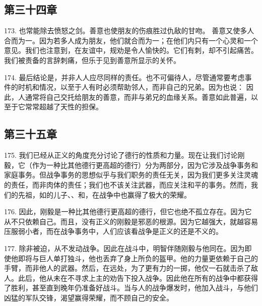\subsection{第三十四章}

\par

173. 也常能除去愤怒之剑。善意也使朋友的伤痕胜过仇敌的甘吻。 善意又使多人合而为一。因为若多人成为朋友，他们就合而为一；在他们内只有一个心灵和一个意见。我们也注意到，在友谊中，规劝是令人愉快的。它们有刺，却不引起痛苦。我们被责备的言辞刺痛，但乐于见到善意所显示的关怀。\par

174. 最后结论是，并非人人应尽同样的责任。也不可偏待人，尽管通常要考虑事件的时机和情况，以至于人有时必须帮助邻人，而非自己的兄弟。因为也说： 因此，人通常将自己交托给朋友的善意，而非与弟兄的血缘关系。善意如此普遍，以至于它常常超越了天性的担保。\par


\subsection{第三十五章}

\par

175. 我们已经从正义的角度充分讨论了德行的性质和力量。现在让我们讨论刚毅，它（作为一种比其他德行更高超的德行）分为两部分，因为它涉及战争事务和家庭事务。但战争事务的思想似乎与我们职务的责任无关，因为我们更多关注灵魂的责任，而非肉体的责任；我们也不该关注武器，而应关注和平的事务。然而，我们的先祖，如的儿子、、和，在战争中也赢得了极大的荣耀。\par

176. 因此，刚毅是一种比其他德行更高超的德行，但它也绝不孤立存在。因为它从不只依赖自己。而且，没有正义的刚毅是邪恶的根源。因为它越强大，就越容易压服弱小者，而在战争事务中，人们应该看战争是正义的还是不义的。\par

177. 除非被迫，从不发动战争。因此在战斗中，明智伴随刚毅与他同在。因为即使他即将与巨人单打独斗，他也丢弃了身上所负的盔甲。他的力量更依赖于自己的手臂，而非他人的武器。然后，在远处，为了更有力的一掷，他仅一石就击杀了敌人。此后，他从未在不寻求上主的劝告下投入战争。因此他在所有的战争中都获得了胜利，甚至直到晚年仍准备好战斗。当与人的战争爆发时，他加入战斗，与他们凶猛的军队交锋，渴望赢得荣耀，而不顾自己的安全。\par

